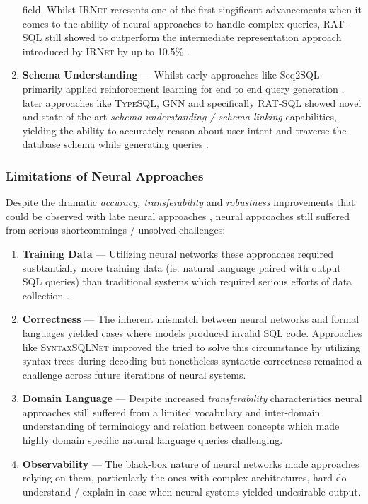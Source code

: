 \begin{enumerate}
          field. Whilst \textsc{IRNet} reresents one of the first singificant advancements when it comes to the ability of neural 
          approaches to handle complex queries, \textsc{RAT-SQL} still showed to outperform the intermediate representation 
          approach introduced by \textsc{IRNet} by up to 10.5\% \citep{IRNet, RATSQL}.
    \item \textbf{Schema Understanding} — Whilst early approaches like Seq2SQL primarily applied reinforcement learning for end to 
          end query generation \citep{Seq2SQL}, later approaches like \textsc{TypeSQL, GNN} and specifically \textsc{RAT-SQL} 
          showed novel and state-of-the-art \textit{schema understanding / schema linking} capabilities, yielding the ability to 
          accurately reason about user intent and traverse the database schema while generating queries \citep{TypeSQL, GNN, 
          RATSQL}. 
\end{enumerate}

\subsubsection{Limitations of Neural Approaches}

Despite the dramatic \textit{accuracy, transferability} and \textit{robustness} improvements that could be observed with late
neural approaches \citep{IRNet, RATSQL}, neural approaches still suffered from serious shortcommings / unsolved challenges:

\begin{enumerate}
    \item \textbf{Training Data} — Utilizing neural networks these approaches required susbtantially more training data 
          (ie. natural language paired with output SQL queries) than traditional systems which required serious efforts of data 
          collection \citep{Spider}.
    \item \textbf{Correctness} — The inherent mismatch between neural networks and formal languages yielded cases where models 
          produced invalid SQL code. Approaches like \textsc{SyntaxSQLNet} improved the tried to solve this circumstance by 
          utilizing syntax trees during decoding but nonetheless syntactic correctness remained a challenge across future
          iterations of neural systems. \citep{SyntaxSQLNet}
    \item \textbf{Domain Language} — Despite increased \textit{transferability} characteristics neural approaches still suffered
          from a limited vocabulary and inter-domain understanding of terminology and relation between concepts which made highly 
          domain specific natural language queries challenging.
    \item \textbf{Observability} — The black-box nature of neural networks made approaches relying on them, particularly the ones 
          with complex architectures, hard do understand / explain in case when neural systems yielded undesirable output. 
\end{enumerate}


